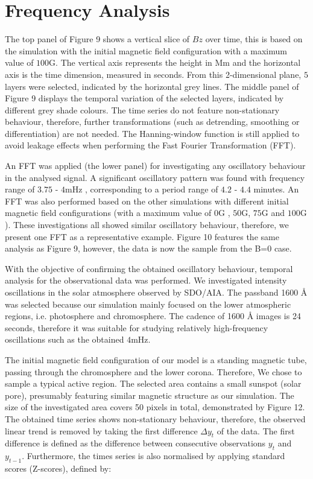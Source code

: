 \documentclass[linenumbers]{aastex63}
\begin{document}
\section{Frequency Analysis}

The top panel of Figure 9 shows a vertical slice of $Bz$ over time, this is based on the simulation with the initial magnetic field configuration with a maximum value of $100$G. The vertical axis represents the height in Mm and the horizontal axis is the time dimension, measured in seconds. From this 2-dimensional plane, $5$ layers were selected, indicated by the horizontal grey lines. The middle panel of Figure 9 displays the temporal variation of the selected layers, indicated by different grey shade colours. The time series do not feature non-stationary behaviour, therefore, further transformations (such as detrending, smoothing or differentiation) are not needed. The Hanning-window function is still applied to avoid leakage effects when performing the Fast Fourier Transformation (FFT).  

An FFT was applied (the lower panel) for investigating any oscillatory behaviour in the analysed signal. A significant oscillatory pattern was found with frequency range of $3.75$ - $4$mHz , corresponding to a period range of $4.2$ - $4.4$ minutes. An FFT was also performed based on the other simulations with different initial magnetic field configurations (with a maximum value of $0$G , $50$G,  $75$G  and $100$G ). These investigations all showed similar oscillatory behaviour, therefore, we present one FFT as a representative example. Figure 10 features the same analysis as Figure 9, however, the data is now the sample from the B=0 case.

With the objective of confirming  the obtained oscillatory behaviour, temporal analysis for the observational data was performed. We investigated intensity oscillations in the solar atmosphere observed by SDO/AIA. The passband 1600 {\AA} was selected because our simulation mainly focused on the lower atmospheric regions, i.e. photosphere and chromosphere. The cadence of 1600 {\AA} images is 24 seconds, therefore it was suitable for studying relatively high-frequency oscillations such as the obtained $4$mHz.


The initial magnetic field configuration of our model is a standing magnetic tube, passing through the chromosphere and the lower corona. Therefore, We chose to sample a typical active region. The selected area contains a small sunspot (solar pore), presumably featuring similar magnetic structure as our simulation.  The size of the investigated area covers 50 pixels in total, demonstrated by Figure 12. The obtained time series shows non-stationary behaviour, therefore, the observed linear trend is removed by taking the first difference $\Delta  y_{t}$ of the data. The first difference is defined as the difference between consecutive observations $y_{t}$ and $y_{t-1}$. Furthermore, the times series is also normalised by applying standard scores (Z-scores), defined by:
\end{document}

